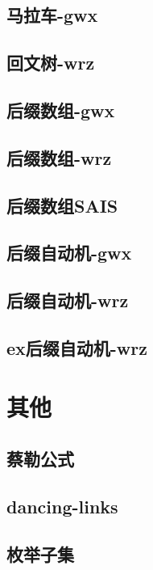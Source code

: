 \documentclass[titlepage,a4paper,10pt]{article}
\begin{document}
\begin{spacing}{0.8}
			\subsection{马拉车-gwx}
				
			\subsection{回文树-wrz}
				
			\subsection{后缀数组-gwx}
				
			\subsection{后缀数组-wrz}
				
			\subsection{后缀数组SAIS}
				
			\subsection{后缀自动机-gwx}
				
			\subsection{后缀自动机-wrz}
				
			\subsection{ex后缀自动机-wrz}
				
		\section{其他}
			\subsection{蔡勒公式}
				
			\subsection{dancing-links}
				
			\subsection{枚举子集}
				

\end{spacing}
\end{document}
